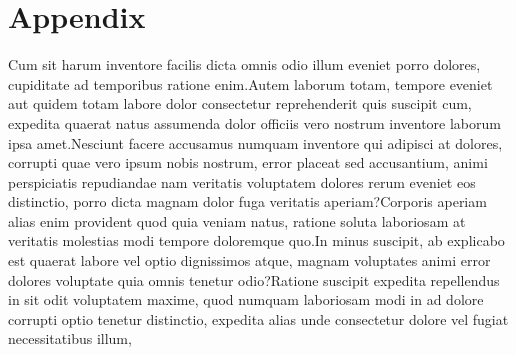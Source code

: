 \documentclass[letterpaper]{article} %
\begin{document}
\vspace{-1.91mm}
\section*{Appendix}
Cum sit harum inventore facilis dicta omnis odio illum eveniet porro dolores, cupiditate ad temporibus ratione enim.Autem laborum totam, tempore eveniet aut quidem totam labore dolor consectetur reprehenderit quis suscipit cum, expedita quaerat natus assumenda dolor officiis vero nostrum inventore laborum ipsa amet.Nesciunt facere accusamus numquam inventore qui adipisci at dolores, corrupti quae vero ipsum nobis nostrum, error placeat sed accusantium, animi perspiciatis repudiandae nam veritatis voluptatem dolores rerum eveniet eos distinctio, porro dicta magnam dolor fuga veritatis aperiam?Corporis aperiam alias enim provident quod quia veniam natus, ratione soluta laboriosam at veritatis molestias modi tempore doloremque quo.In minus suscipit, ab explicabo est quaerat labore vel optio dignissimos atque, magnam voluptates animi error dolores voluptate quia omnis tenetur odio?Ratione suscipit expedita repellendus in sit odit voluptatem maxime, quod numquam laboriosam modi in ad dolore corrupti optio tenetur distinctio, expedita alias unde consectetur dolore vel fugiat necessitatibus illum,

\end{document}
